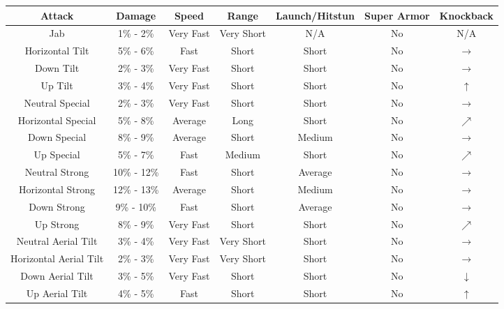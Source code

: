 \begin{table}[h!]
    \centering
    \begin{tabular}{| c | c | c | c | c | c | c |}
        \hline
        \textbf{Attack} & \textbf{Damage} & \textbf{Speed} & \textbf{Range} & \textbf{Launch/Hitstun} & \textbf{Super Armor} & \textbf{Knockback} \\
        \hline
        Jab & 1\% - 2\% & Very Fast & Very Short & N/A & No & N/A \\
        \hline
        Horizontal Tilt & 5\% - 6\% & Fast & Short & Short & No & $\rightarrow$ \\
        \hline
        Down Tilt & 2\% - 3\% & Very Fast & Short & Short & No & $\rightarrow$ \\
        \hline
        Up Tilt & 3\% - 4\% & Very Fast & Short & Short & No & $\uparrow$ \\
        \hline
        Neutral Special & 2\% - 3\% & Very Fast & Short & Short & No & $\rightarrow$ \\
        \hline
        Horizontal Special & 5\% - 8\% & Average & Long & Short & No & $\nearrow$ \\
        \hline
        Down Special & 8\% - 9\% & Average & Short & Medium & No & $\rightarrow$ \\
        \hline
        Up Special & 5\% - 7\% & Fast & Medium & Short & No & $\nearrow$ \\
        \hline
        Neutral Strong & 10\% - 12\% & Fast & Short & Average & No & $\rightarrow$ \\
        \hline
        Horizontal Strong & 12\% - 13\% & Average & Short & Medium & No & $\rightarrow$ \\
        \hline
        Down Strong & 9\% - 10\% & Fast & Short & Average & No & $\rightarrow$ \\
        \hline
        Up Strong & 8\% - 9\% & Very Fast & Short & Short & No & $\nearrow$ \\
        \hline
        Neutral Aerial Tilt & 3\% - 4\% & Very Fast & Very Short & Short & No & $\rightarrow$ \\
        \hline
        Horizontal Aerial Tilt & 2\% - 3\% & Very Fast & Very Short & Short & No & $\rightarrow$ \\
        \hline
        Down Aerial Tilt & 3\% - 5\% & Very Fast & Short & Short & No & $\downarrow$ \\
        \hline
        Up Aerial Tilt & 4\% - 5\% & Fast & Short & Short & No & $\uparrow$ \\
        \hline

\end{tabular}
\end{table}

